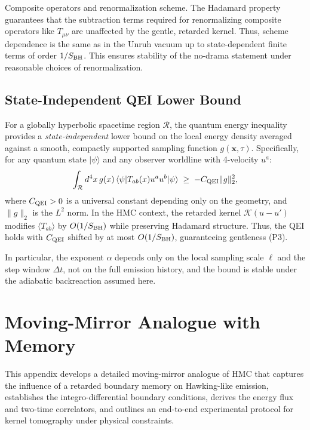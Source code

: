 \documentclass[aps,prd,preprint,onecolumn,superscriptaddress,nofootinbib,longbibliography,floatfix,11pt,showpacs,showkeys]{revtex4-2}
\newcommand{\HMC}{\textsc{HMC}\xspace}
\theoremstyle{plain}
\theoremstyle{definition}
\theoremstyle{remark}
\begin{document}
Composite operators and renormalization scheme. The Hadamard property guarantees that the subtraction terms required for renormalizing composite operators like $T_{\mu\nu}$ are unaffected by the gentle, retarded kernel. Thus, scheme dependence is the same as in the Unruh vacuum up to state-dependent finite terms of order $1/S_{\rm BH}$. This ensures stability of the no-drama statement under reasonable choices of renormalization.

\subsection{State-Independent QEI Lower Bound}
For a globally hyperbolic spacetime region $\mathcal{R}$, the quantum energy inequality provides a \emph{state-independent} lower bound on the local energy density averaged against a smooth, compactly supported sampling function $g(\mathbf{x},\tau)$. Specifically, for any quantum state $|\psi\rangle$ and any observer worldline with 4-velocity $u^a$:
\begin{equation}
\int_{\mathcal{R}} d^4x\, g(x)\,\langle\psi| T_{ab}(x)u^a u^b|\psi\rangle \;\ge\; -C_{\rm QEI}\|g\|_2^2,
\end{equation}
where $C_{\rm QEI}>0$ is a universal constant depending only on the geometry, and $\|g\|_2$ is the $L^2$ norm. In the \HMC{} context, the retarded kernel $\mathcal{K}(u-u')$ modifies $\langle T_{ab}\rangle$ by $O(1/S_{\rm BH})$ while preserving Hadamard structure. Thus, the QEI holds with $C_{\rm QEI}$ shifted by at most $O(1/S_{\rm BH})$, guaranteeing gentleness (P3).

\noindent In particular, the exponent \(\alpha\) depends only on the local sampling scale \(\ell\) and the step window \(\Delta t\), not on the full emission history, and the bound is stable under the adiabatic backreaction assumed here.


\section{Moving-Mirror Analogue with Memory}
\label{app:moving_mirror} %
This appendix develops a detailed moving-mirror analogue of \HMC{} that captures the influence of a retarded boundary memory on Hawking-like emission, establishes the integro-differential boundary conditions, derives the energy flux and two-time correlators, and outlines an end-to-end experimental protocol for kernel tomography under physical constraints.
\end{document}
